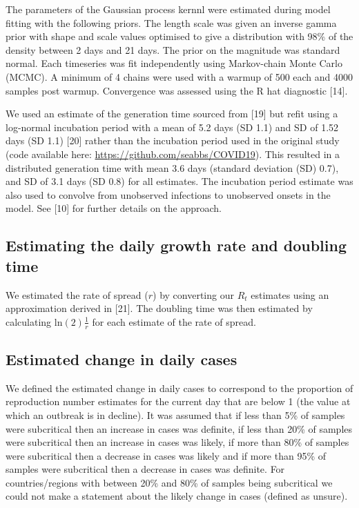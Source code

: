 \documentclass[
]{article}
\begin{document}
The parameters of the Gaussian process kernnl were estimated during
model fitting with the following priors. The length scale was given an
inverse gamma prior with shape and scale values optimised to give a
distribution with 98\% of the density between 2 days and 21 days. The
prior on the magnitude was standard normal. Each timeseries was fit
independently using Markov-chain Monte Carlo (MCMC). A minimum of 4
chains were used with a warmup of 500 each and 4000 samples post warmup.
Convergence was assessed using the R hat diagnostic {[}14{]}.

We used an estimate of the generation time sourced from {[}19{]} but
refit using a log-normal incubation period with a mean of 5.2 days (SD
1.1) and SD of 1.52 days (SD 1.1) {[}20{]} rather than the incubation
period used in the original study (code available here:
\url{https://github.com/seabbs/COVID19}). This resulted in a distributed
generation time with mean 3.6 days (standard deviation (SD) 0.7), and SD
of 3.1 days (SD 0.8) for all estimates. The incubation period estimate
was also used to convolve from unobserved infections to unobserved
onsets in the model. See {[}10{]} for further details on the approach.

\hypertarget{estimating-the-daily-growth-rate-and-doubling-time}{%
\subsection{Estimating the daily growth rate and doubling
time}\label{estimating-the-daily-growth-rate-and-doubling-time}}

We estimated the rate of spread (\(r\)) by converting our \(R_t\)
estimates using an approximation derived in {[}21{]}. The doubling time
was then estimated by calculating \(\text{ln}(2) \frac{1}{r}\) for each
estimate of the rate of spread.

\hypertarget{estimated-change-in-daily-cases}{%
\subsection{Estimated change in daily
cases}\label{estimated-change-in-daily-cases}}

We defined the estimated change in daily cases to correspond to the
proportion of reproduction number estimates for the current day that are
below 1 (the value at which an outbreak is in decline). It was assumed
that if less than 5\% of samples were subcritical then an increase in
cases was definite, if less than 20\% of samples were subcritical then
an increase in cases was likely, if more than 80\% of samples were
subcritical then a decrease in cases was likely and if more than 95\% of
samples were subcritical then a decrease in cases was definite. For
countries/regions with between 20\% and 80\% of samples being
subcritical we could not make a statement about the likely change in
cases (defined as unsure).
\end{document}
